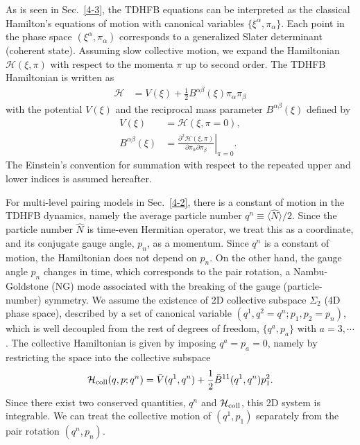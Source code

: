 \documentclass[11pt]{book} %
\begin{document}
As is seen in Sec.~\ref{4-3}, the TDHFB equations can be
interpreted as the classical Hamilton's equations of motion
with canonical variables $\{\xi^{\alpha},\pi_{\alpha}\}$. 
Each point in the phase space $(\xi^{\alpha},\pi_{\alpha})$
corresponds to a generalized Slater determinant (coherent state).
Assuming slow collective motion,
we expand the Hamiltonian $\mathcal{H}(\xi,\pi)$ with respect to
the momenta $\pi$ up to second order.
The TDHFB Hamiltonian is written as
\begin{align}
 \mathcal{H} &= V(\xi) + \frac{1}{2}B^{\alpha\beta}(\xi)\pi_{\alpha}\pi_{\beta}
\end{align}
with the potential $V(\xi)$ and
the reciprocal mass parameter $B^{\alpha\beta}(\xi)$ defined by
\begin{align}
  V(\xi) &= \mathcal{H}(\xi,\pi=0) , \\
  B^{\alpha\beta}(\xi) &= \left. \frac{\partial^2\mathcal{H}(\xi,\pi)}{\partial\pi_{\alpha}\partial\pi_{\beta}} \right|_{\pi=0}.
\end{align}
The Einstein's convention for summation with respect to the repeated
upper and lower indices is assumed hereafter.

For multi-level pairing models in Sec.~\ref{4-2}, 
there is a constant of motion in the TDHFB dynamics,
namely the average particle number $q^n\equiv \langle \hat{N} \rangle/2$.
Since the particle number $\hat{N}$ is time-even Hermitian operator, we treat
this as a coordinate, and its conjugate gauge angle, $p_n$,
as a momentum.
Since $q^n$ is a constant of motion, the Hamiltonian does not
depend on $p_n$.
On the other hand, the gauge angle $p_n$ changes in time,
which corresponds to the pair rotation, a Nambu-Goldstone (NG) mode
associated with the breaking of the gauge (particle-number) symmetry.
We assume the existence of 2D collective subspace $\Sigma_2$
(4D phase space),
described by a set of canonical variable $(q^1,q^2=q^n;p_1,p_2=p_n)$,
which is well decoupled from the rest of degrees of freedom,
$\{q^a,p_a\}$ with $a=3,\cdots$.
The collective Hamiltonian is given by imposing $q^a=p_a=0$,
namely by restricting the space into the collective subspace
\begin{equation}
\mathcal{H}_{\rm coll}(q,p;q^n)
= \bar{V}(q^1,q^n) + \frac{1}{2}\bar{B}^{11}(q^1,q^n)p_1^2 .
  \label{coll}
\end{equation}
Since there exist two conserved quantities, $q^n$ and $\mathcal{H}_{\rm coll}$,
this 2D system is integrable.
We can treat the collective motion of $(q^1,p_1)$ separately from
the pair rotation $(q^n, p_n)$.
\end{document}
